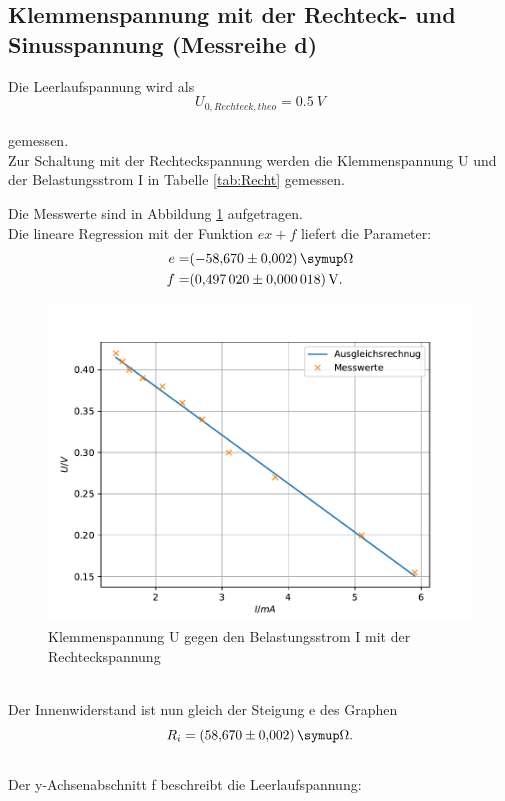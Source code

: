 \subsection{Klemmenspannung mit der Rechteck- und Sinusspannung (Messreihe d)}
Die Leerlaufspannung wird als
\begin{equation*}
  U_{0, Rechteck, theo}=\SI{0.5}{V}
\end{equation*}
\\gemessen.
\\Zur Schaltung mit der Rechteckspannung werden die Klemmenspannung U und der Belastungsstrom I in Tabelle \ref{tab:Recht} gemessen.

Die Messwerte sind in Abbildung \ref{fig:Recht} aufgetragen.
\\Die lineare Regression mit der Funktion $ex+f$ liefert die Parameter:
\begin{align*}
e=& \SI{-58.67 \pm 0.002}{\symup\Omega}\\
f=& \SI{0.497020 \pm 0.000018}{V}.\\
\end{align*}
\begin{figure}[h!]
  \centering
  \includegraphics[width=\textwidth]{Recht.pdf}
  \caption{Klemmenspannung U gegen den Belastungsstrom I mit der Rechteckspannung}
  \label{fig:Recht}
\end{figure}
\\Der Innenwiderstand ist nun gleich der Steigung e des Graphen
\begin{equation*}
  R_{i}= \SI{58.67 \pm 0.002}{\symup\Omega}.
\end{equation*}
\\Der y-Achsenabschnitt f beschreibt die Leerlaufspannung:
